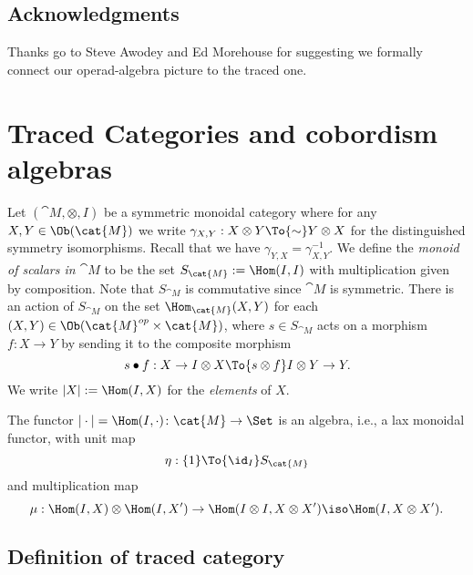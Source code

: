 \section*{Acknowledgments}

Thanks go to Steve Awodey and Ed Morehouse for suggesting we formally connect our operad-algebra picture to the traced one. 

\chapter{Traced Categories and cobordism algebras}\label{sec:traced categories}

Let $(\cat{M},\otimes,I)$ be a symmetric monoidal category where for any $X,Y\in\Ob(\cat{M})$ we write $\gamma_{X,Y}:X\otimes Y\To{\sim} Y\otimes X$ for the distinguished symmetry isomorphisms. Recall that we have $\gamma_{Y,X}=\gamma_{X,Y}^{-1}$.  We define the {\em monoid of scalars in $\cat{M}$} to be the set $S_{\cat{M}}:=\Hom(I,I)$ with multiplication given by composition.  Note that $S_{\cat{M}}$ is commutative since $\cat{M}$ is symmetric.  There is an action of $S_{\cat{M}}$ on the set $\Hom_{\cat{M}}(X,Y)$ for each $(X,Y)\in\Ob(\cat{M}^{op}\times\cat{M})$, where $s\in S_{\cat{M}}$ acts on a morphism $f\colon X\to Y$ by sending it to the composite morphism
$$s\bullet f:X\to I\otimes X\To{s\otimes f}I\otimes Y\to Y.$$
We write $|X|:=\Hom(I,X)$ for the \emph{elements} of $X$.

The functor $|\cdot|=\Hom(I,\cdot)\colon\cat{M}\to\Set$ is an algebra, i.e., a lax monoidal functor, with unit map
\[\eta:\{1\}\To{\id_{I}}S_{\cat{M}}\]
and multiplication map
\[\mu:\Hom(I,X)\otimes\Hom(I,X')\to\Hom(I\otimes I,X\otimes X')\iso\Hom(I,X\otimes X').\]

\section{Definition of traced category}\label{sec:define traced}

